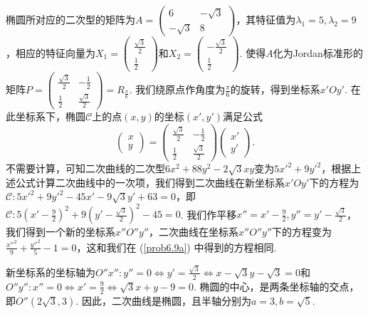 \begin{solution}
\begin{inparaenum}[(a)]
    \item 椭圆所对应的二次型的矩阵为$A=\begin{pmatrix}
      6 & - \sqrt3 \\
      -\sqrt3 & 8
    \end{pmatrix}$，其特征值为$\lambda_1=5,\lambda_2=9$，相应的特征向量为$X_1=\begin{pmatrix}
      \frac{\sqrt3}2 \\
      \frac12
    \end{pmatrix}$和$X_2=\begin{pmatrix}
      -\frac{\sqrt3}2 \\
      \frac12
    \end{pmatrix}$. 使得$A$化为Jordan标准形的矩阵$P=\begin{pmatrix}
      \frac{\sqrt3}2 & - \frac12 \\
      \frac12 & \frac{\sqrt3}2
    \end{pmatrix}=R_{\frac\pi6}$. 我们绕原点作角度为$\frac\pi6$的旋转，得到坐标系$x'Oy'$. 在此坐标系下，椭圆$\mathscr C$上的点$(x,y)$的坐标$(x',y')$满足公式
    \[
      \begin{pmatrix}
        x \\
        y
      \end{pmatrix} =
      \begin{pmatrix}
      \frac{\sqrt3}2 & - \frac12 \\
      \frac12 & \frac{\sqrt3}2
    \end{pmatrix}
    \begin{pmatrix}
        x' \\
        y'
      \end{pmatrix}.
    \]
    不需要计算，可知二次曲线的二次型$6x^2+88y^2-2\sqrt3xy$变为$5x'^2+9y'^2$，根据上述公式计算二次曲线中的一次项，我们得到二次曲线在新坐标系$x'Oy'$下的方程为$\mathscr C:5x'^2+9y'^2-45x'-9\sqrt3y'+63=0$，即$\mathscr C:5\left(x'-\frac92\right)^2+
    9\left(y'-\frac{\sqrt3}2\right)^2-45=0$. 我们作平移$x''=x'-\frac92,y''=y'-\frac{\sqrt3}2$，我们得到一个新的坐标系$x''O''y''$，二次曲线在坐标系$x''O''y''$下的方程变为$\frac{x''^2}9+\frac{y''^2}5-1=0$，这和我们在 (\ref{prob6.9a}) 中得到的方程相同.

    新坐标系的坐标轴为$O''x'':y''=0\Leftrightarrow y'=\frac{\sqrt3}2\Leftrightarrow x-\sqrt3y-\sqrt3=0$和$O''y'':x''=0\Leftrightarrow
    x'=\frac92\Leftrightarrow \sqrt3x+y-9=0$. 椭圆的中心，是两条坐标轴的交点，即$O''(2\sqrt3,3)$. 因此，二次曲线是椭圆，且半轴分别为$a=3,b=\sqrt5$.
  \end{inparaenum}
\end{solution}


